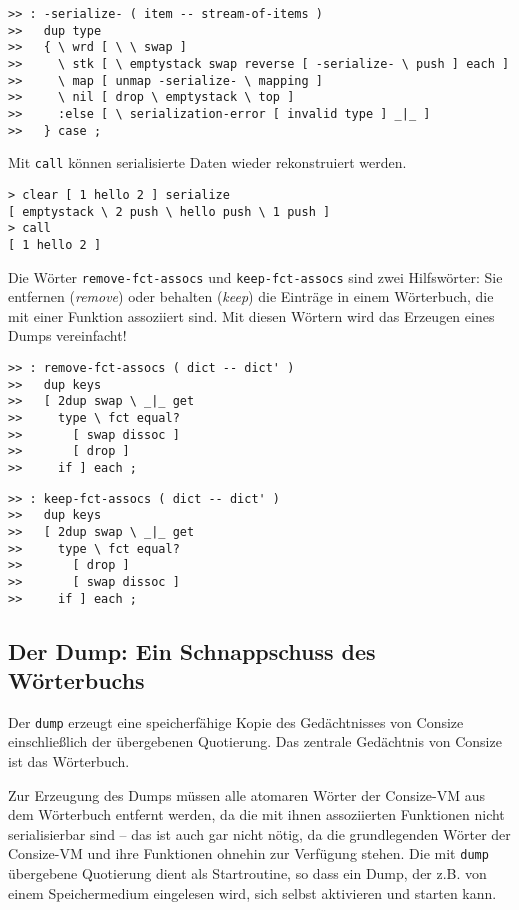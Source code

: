\begin{verbatim}  
>> : -serialize- ( item -- stream-of-items )
>>   dup type
>>   { \ wrd [ \ \ swap ] 
>>     \ stk [ \ emptystack swap reverse [ -serialize- \ push ] each ]
>>     \ map [ unmap -serialize- \ mapping ]
>>     \ nil [ drop \ emptystack \ top ]
>>     :else [ \ serialization-error [ invalid type ] _|_ ]
>>   } case ;
\end{verbatim}

Mit \verb|call| können serialisierte Daten wieder rekonstruiert werden.

\begin{verbatim}
> clear [ 1 hello 2 ] serialize
[ emptystack \ 2 push \ hello push \ 1 push ]
> call
[ 1 hello 2 ]
\end{verbatim}

Die Wörter \verb|remove-fct-assocs| und \verb|keep-fct-assocs| sind zwei Hilfs\-wör\-ter: Sie entfernen (\emph{remove}) oder behalten (\emph{keep}) die Einträge in einem Wörterbuch, die mit einer Funktion assoziiert sind. Mit diesen Wörtern wird das Erzeugen eines Dumps vereinfacht!

\begin{verbatim}  
>> : remove-fct-assocs ( dict -- dict' )
>>   dup keys
>>   [ 2dup swap \ _|_ get
>>     type \ fct equal?
>>       [ swap dissoc ]
>>       [ drop ]
>>     if ] each ;
\end{verbatim}

\begin{verbatim}    
>> : keep-fct-assocs ( dict -- dict' )
>>   dup keys
>>   [ 2dup swap \ _|_ get
>>     type \ fct equal?
>>       [ drop ]
>>       [ swap dissoc ]
>>     if ] each ;
\end{verbatim}

\subsection{Der Dump: Ein Schnappschuss des Wörterbuchs}

Der \verb|dump| erzeugt eine speicherfähige Kopie des Gedächtnisses von Consize einschließlich der übergebenen Quotierung. Das zentrale Gedächtnis von Consize ist das Wörterbuch.

Zur Erzeugung des Dumps müssen alle atomaren Wörter der Consize-VM aus dem Wörterbuch entfernt werden, da die mit ihnen assoziierten Funktionen nicht serialisierbar sind -- das ist auch gar nicht nötig, da die grundlegenden Wörter der Consize-VM und ihre Funktionen ohnehin zur Verfügung stehen. Die mit \verb|dump| übergebene Quotierung dient als Startroutine, so dass ein Dump, der z.B. von einem Speichermedium eingelesen wird, sich selbst aktivieren und starten kann.

